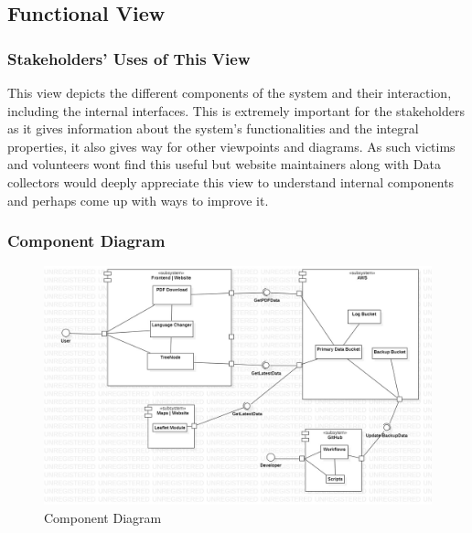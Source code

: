 \vspace*{\fill}
\newpage

\subsection{Functional View}

\subsubsection{Stakeholders' Uses of This View}

This view depicts the different components of the system and their interaction, including the internal interfaces. This is extremely important for the stakeholders as it gives information about the system's functionalities and the integral properties, it also gives way for other viewpoints and diagrams. As such victims and volunteers wont find this useful but website maintainers along with Data collectors would deeply appreciate this view to understand internal components and perhaps come up with ways to improve it.

\subsubsection{Component Diagram}

\begin{figure}[H]
  \centering
  \includegraphics[width=\linewidth]{img/component-diagram.jpg}
  \caption{Component Diagram}
\end{figure}

